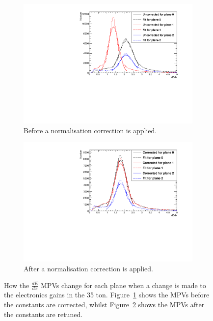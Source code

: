 \begin{figure}[h!]
  \centering
  \begin{subfigure}{0.45\textwidth}
    \centering
    \includegraphics[width=\textwidth]{UnCorrectedCanvas}
    \caption{Before a normalisation correction is applied.}
    \label{fig:CaloTune_Before}
  \end{subfigure}
  \hspace{0.08\textwidth}
  \begin{subfigure}{0.45\textwidth}
    \centering
    \includegraphics[width=\textwidth]{CorrectedCanvas}
    \caption{After a normalisation correction is applied.}
    \label{fig:CaloTune_After}
  \end{subfigure}
  \caption[The tuning of the calorimetric constants in the 35 ton]
          {How the $\frac{dE}{dx}$ MPVs change for each plane when a change is made to the electronics gains in the 35 ton. Figure~\ref{fig:CaloTune_Before} shows the MPVs before the constants are corrected, whilst Figure~\ref{fig:CaloTune_After} shows the MPVs after the constants are retuned.}
          \label{fig:CaloTune}
\end{figure}
        

